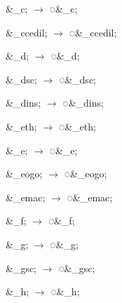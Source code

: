 \documentclass[letterpaper,12pt]{article}
\newcommand\textstyleEntityRef[1]{\textrm{#1}}
\begin{document}
\begin{multicols}{3}
\textcolor[rgb]{0.20392157,0.39607844,0.6431373}{\&{\textcompwordmark}\_c; $\rightarrow $
}\textstyleEntityRef{\textcolor[rgb]{0.20392157,0.39607844,0.6431373}{◌\&\_c;}}

\textcolor[rgb]{0.20392157,0.39607844,0.6431373}{\narrow\&{\textcompwordmark}\_ccedil; $\rightarrow $
}\textstyleEntityRef{\textcolor[rgb]{0.20392157,0.39607844,0.6431373}{◌\&\_ccedil;}}

\textcolor[rgb]{0.20392157,0.39607844,0.6431373}{\&{\textcompwordmark}\_d; $\rightarrow $
}\textstyleEntityRef{\textcolor[rgb]{0.20392157,0.39607844,0.6431373}{◌\&\_d;}}

\textcolor[rgb]{0.20392157,0.39607844,0.6431373}{\&{\textcompwordmark}\_dsc; $\rightarrow $
}\textstyleEntityRef{\textcolor[rgb]{0.20392157,0.39607844,0.6431373}{◌\&\_dsc;}}

\textcolor[rgb]{0.20392157,0.39607844,0.6431373}{\&{\textcompwordmark}\_dins; $\rightarrow $
}\textstyleEntityRef{\textcolor[rgb]{0.20392157,0.39607844,0.6431373}{◌\&\_dins;}}

\textcolor[rgb]{0.20392157,0.39607844,0.6431373}{\&{\textcompwordmark}\_eth; $\rightarrow $
}\textstyleEntityRef{\textcolor[rgb]{0.20392157,0.39607844,0.6431373}{◌\&\_eth;}}

\textcolor[rgb]{0.20392157,0.39607844,0.6431373}{\&{\textcompwordmark}\_e; $\rightarrow $
}\textstyleEntityRef{\textcolor[rgb]{0.20392157,0.39607844,0.6431373}{◌\&\_e;}}

\textcolor[rgb]{0.20392157,0.39607844,0.6431373}{\&{\textcompwordmark}\_eogo; $\rightarrow $
}\textstyleEntityRef{\textcolor[rgb]{0.20392157,0.39607844,0.6431373}{◌\&\_eogo;}}

\textcolor[rgb]{0.20392157,0.39607844,0.6431373}{\&{\textcompwordmark}\_emac; $\rightarrow $
}\textstyleEntityRef{\textcolor[rgb]{0.20392157,0.39607844,0.6431373}{◌\&\_emac;}}

\textcolor[rgb]{0.20392157,0.39607844,0.6431373}{\&{\textcompwordmark}\_f; $\rightarrow $
}\textstyleEntityRef{\textcolor[rgb]{0.20392157,0.39607844,0.6431373}{◌\&\_f;}}

\textcolor[rgb]{0.20392157,0.39607844,0.6431373}{\&{\textcompwordmark}\_g; $\rightarrow $
}\textstyleEntityRef{\textcolor[rgb]{0.20392157,0.39607844,0.6431373}{◌\&\_g;}}

\textcolor[rgb]{0.20392157,0.39607844,0.6431373}{\&{\textcompwordmark}\_gsc; $\rightarrow $
}\textstyleEntityRef{\textcolor[rgb]{0.20392157,0.39607844,0.6431373}{◌\&\_gsc;}}

\textcolor[rgb]{0.20392157,0.39607844,0.6431373}{\&\_{\textcompwordmark}h; $\rightarrow $
}\textstyleEntityRef{\textcolor[rgb]{0.20392157,0.39607844,0.6431373}{◌\&\_h;}}


\end{multicols}
\end{document}
